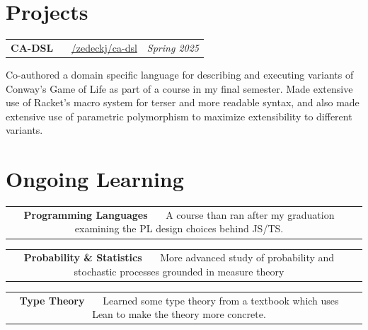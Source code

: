 \documentclass[letterpaper,11pt]{article}
\makeatletter
\newcommand{\resumeSubheading}[5]{
  \vspace{-1pt}\item
    \begin{tabular*}{0.97\textwidth}[t]{c@{\extracolsep{\fill}} r }
      \small\textbf{#1} \headingcap{#3} \ \ \ #2 &  \raggedleft\textit{\small #4} 
    \end{tabular*}
    \small#5
}
\makeatother
\begin{document}
\section{Projects}
\resumeSubheading{CA-DSL}{\href{https://github.com/zedeckj/ca-dsl}{\faIcon{github}/zedeckj/ca-dsl}}{Typed Racket}{Spring 2025}{Co-authored a domain specific language for describing and executing variants of Conway's Game of Life as part of a course in my final semester. Made extensive use of Racket's macro system for terser and more readable syntax, and also made extensive use of parametric polymorphism to maximize extensibility to different variants.}
\section{Ongoing Learning}
\resumeSubheading{Programming Languages}{A course than ran after my graduation examining the PL design choices behind JS/TS.}{\href{https://felleisen.org/matthias/4400-f25/index.html}{\faIcon{link}}}{}{}
\resumeSubheading{Probability \& Statistics}{More advanced study of probability and stochastic processes grounded in measure theory}{\href{https://tropp.caltech.edu/notes/Tro24-Probability-Theory-LN.pdf}{\faIcon{link}}}{}{}
\resumeSubheading{Type Theory}{Learned some type theory from a textbook which uses Lean to make the theory more concrete.}{\href{https://raw.githubusercontent.com/blanchette/logical_verification_2023/main/hitchhikers_guide.pdf}{\faIcon{link}}}{}{}

\end{document}
